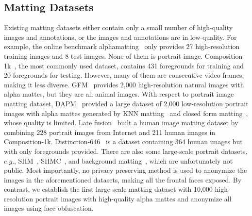 \documentclass[sigconf]{acmart}
\begin{document}
\subsection{Matting Datasets}
Existing matting datasets either contain only a small number of high-quality images and annotations, or the images and annotations are in low-quality. For example, the online benchmark alphamatting~\cite{TUW-180666} only provides 27 high-resolution training images and 8 test images. None of them is portrait image. Composition-1k~\cite{dim}, the most commonly used dataset, contains 431 foregrounds for training and 20 foregrounds for testing. However, many of them are consecutive video frames, making it less diverse. GFM~\cite{gfm} provides 2,000 high-resolution natural images with alpha mattes, but they are all animal images. With respect to portrait image matting dataset, DAPM~\cite{dapm} provided a large dataset of 2,000 low-resolution portrait images with alpha mattes generated by KNN matting~\cite{chen2013knn} and closed form matting~\cite{levin2007closed}, whose quality is limited. Late fusion~\cite{lf} built a human image matting dataset by combining 228 portrait images from Internet and 211 human images in Composition-1k. Distinction-646~\cite{hatt} is a dataset containing 364 human images but with only foregrounds provided. There are also some large-scale portrait datasets, $e.g.$, SHM~\cite{shm}, SHMC~\cite{shmc}, and background matting~\cite{backgroundmatting, backgroundmattingv2}, which are unfortunately not public. Most importantly, no privacy preserving method is used to anonymize the images in the aforementioned datasets, making all the frontal faces exposed. By contrast, we establish the first large-scale matting dataset with 10,000 high-resolution portrait images with high-quality alpha mattes and anonymize all images using face obfuscation.
\end{document}
